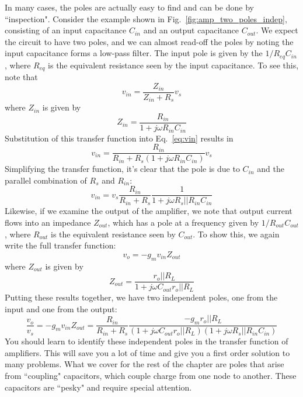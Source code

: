 In many cases, the poles are actually easy to find and can be done by ``inspection".  Consider the example shown in Fig.~\ref{fig:amp_two_poles_indep}, consisting of an input capacitance $C_{in}$ and an output capacitance $C_{out}$.  We expect the circuit to have two poles, and we can almost read-off the poles by noting the input capacitance forms a low-pass filter.  The input pole is given by the $1/R_{eq}C_{in}$, where $R_{eq}$ is the equivalent resistance seen by the input capacitance.  To see this, note that
%
\begin{equation}
	v_{in} = \frac{Z_{in}}{Z_{in} + R_s} v_s \label{eq:vin}
\end{equation} 
%
where $Z_{in}$ is given by
%
\begin{equation}
	Z_{in} = \frac{R_{in}}{1 + j\omega R_{in} C_{in}}
\end{equation}
%
Substitution of this transfer function into Eq.~\ref{eq:vin} results in
%
\begin{equation}
	v_{in} = \frac{R_{in}}{R_{in} + R_s(1 + j\omega R_{in} C_{in})} v_s 
\end{equation}
%
Simplifying the transfer function, it's clear that the pole is due to $C_{in}$ and the parallel combination of $R_s $ and $R_{in}$:
%
\begin{equation}
	v_{in} = v_s \frac{R_{in}}{R_{in} + R_s} \frac{1}{ 1 + j\omega R_s || R_{in} C_{in}} 
\end{equation}
%
Likewise, if we examine the output of the amplifier, we note that output current flows into an impedance $Z_{out}$, which has a pole at a frequency given by $1/R_{out}C_{out}$, where $R_{out}$ is the equivalent resistance seen by $C_{out}$.  To show this, we again write the full transfer function:
%
\begin{equation}
	v_o = -g_m v_{in} Z_{out} 
\end{equation}
%
where $Z_{out}$ is given by
%
\begin{equation}
	Z_{out} = \frac{r_o || R_L}{1 + j\omega C_{out} r_o || R_L}
\end{equation}
%
Putting these results together, we have two independent poles, one from the input and one from the output:
%
\begin{equation}
	\frac{v_o}{v_s} = -g_m v_{in} Z_{out} = \frac{R_{in}}{R_{in} + R_s} \frac{-g_m r_o || R_L}{(1 + j\omega C_{out} r_o || R_L)(1 + j\omega R_s || R_{in} C_{in})}
\end{equation}
%
You should learn to identify these independent poles in the transfer function of amplifiers.  This will save you a lot of time and give you a first order solution to many problems.  What we cover for the rest of the chapter are poles that arise from ``coupling" capacitors, which couple charge from one node to another. These capacitors are ``pesky" and require special attention.


